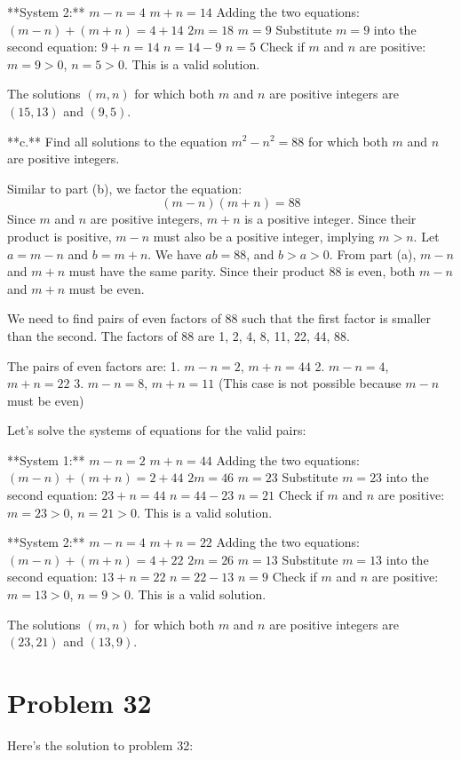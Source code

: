 \documentclass{article}
\begin{document}
**System 2:**
$m-n = 4$
$m+n = 14$
Adding the two equations:
$(m-n) + (m+n) = 4 + 14$
$2m = 18$
$m = 9$
Substitute $m=9$ into the second equation:
$9 + n = 14$
$n = 14 - 9$
$n = 5$
Check if $m$ and $n$ are positive: $m=9 > 0$, $n=5 > 0$. This is a valid solution.

The solutions $(m, n)$ for which both $m$ and $n$ are positive integers are $(15, 13)$ and $(9, 5)$.

**c.** Find all solutions to the equation $m^2 - n^2 = 88$ for which both $m$ and $n$ are positive integers.

Similar to part (b), we factor the equation:
$$ (m-n)(m+n) = 88 $$
Since $m$ and $n$ are positive integers, $m+n$ is a positive integer. Since their product is positive, $m-n$ must also be a positive integer, implying $m > n$.
Let $a = m-n$ and $b = m+n$. We have $ab = 88$, and $b > a > 0$.
From part (a), $m-n$ and $m+n$ must have the same parity. Since their product $88$ is even, both $m-n$ and $m+n$ must be even.

We need to find pairs of even factors of 88 such that the first factor is smaller than the second. The factors of 88 are 1, 2, 4, 8, 11, 22, 44, 88.

The pairs of even factors are:
1. $m-n = 2$, $m+n = 44$
2. $m-n = 4$, $m+n = 22$
3. $m-n = 8$, $m+n = 11$ (This case is not possible because $m-n$ must be even)

Let's solve the systems of equations for the valid pairs:

**System 1:**
$m-n = 2$
$m+n = 44$
Adding the two equations:
$(m-n) + (m+n) = 2 + 44$
$2m = 46$
$m = 23$
Substitute $m=23$ into the second equation:
$23 + n = 44$
$n = 44 - 23$
$n = 21$
Check if $m$ and $n$ are positive: $m=23 > 0$, $n=21 > 0$. This is a valid solution.

**System 2:**
$m-n = 4$
$m+n = 22$
Adding the two equations:
$(m-n) + (m+n) = 4 + 22$
$2m = 26$
$m = 13$
Substitute $m=13$ into the second equation:
$13 + n = 22$
$n = 22 - 13$
$n = 9$
Check if $m$ and $n$ are positive: $m=13 > 0$, $n=9 > 0$. This is a valid solution.

The solutions $(m, n)$ for which both $m$ and $n$ are positive integers are $(23, 21)$ and $(13, 9)$.

\newpage

\section*{Problem 32}
Here's the solution to problem 32:
\end{document}
